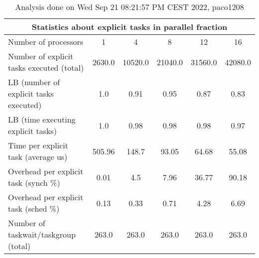\begin{table}[h]
\begin{center}
\begin{tabular}{|l|c|c|c|c|c|}
\hline
\multicolumn{6}{|c|}{Statistics about explicit tasks in parallel fraction} \\
\hline
\hline
Number of processors & 1 & 4 & 8 & 12 & 16 \\
\hline
\hline
Number of explicit tasks executed (total)        &          2630.0 &         10520.0 &         21040.0 &         31560.0 &         42080.0 \\
\hline
LB (number of explicit tasks executed)           &             1.0 &            0.91 &            0.95 &            0.87 &            0.83 \\
\hline
LB (time executing explicit tasks)               &             1.0 &            0.98 &            0.98 &            0.98 &            0.97 \\
\hline
Time per explicit task (average us)                 &          505.96 &           148.7 &           93.05 &           64.68 &           55.08 \\
\hline
Overhead per explicit task (synch \%)             &            0.01 &             4.5 &            7.96 &           36.77 &           90.18 \\
\hline
Overhead per explicit task (sched \%)             &            0.13 &            0.33 &            0.71 &            4.28 &            6.69 \\
\hline
Number of taskwait/taskgroup (total)             &           263.0 &           263.0 &           263.0 &           263.0 &           263.0 \\
\hline
\end{tabular}
\end{center}
\caption{ Analysis done on Wed Sep 21 08:21:57 PM CEST 2022, paco1208}
\end{table}

